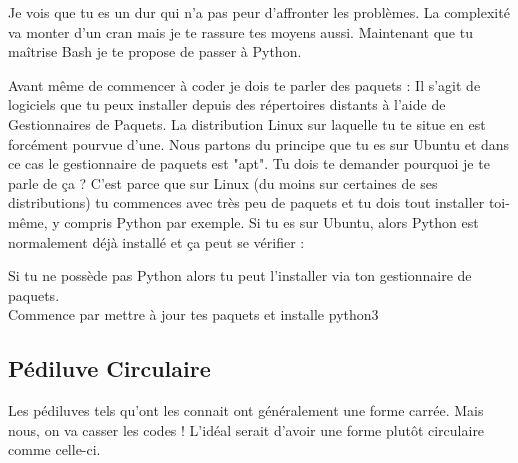\documentclass[a4paper, 12pt]{article}
\begin{document}
{\comfortaa
    Je vois que tu es un dur qui n'a pas peur d'affronter les problèmes.
    La complexité va monter d'un cran mais je te rassure tes moyens aussi.
    \newline \newline
    Maintenant que tu maîtrise Bash je te propose de passer à Python.

    Avant même de commencer à coder je dois te parler des paquets :
    \newline \newline
    Il s'agit de logiciels que tu peux installer depuis des répertoires distants à l'aide
    de Gestionnaires de Paquets. La distribution Linux sur laquelle tu te situe en est
    forcément pourvue d'une. Nous partons du principe que tu es sur Ubuntu et dans ce
    cas le gestionnaire de paquets est "apt". 
    \newline\newline
    Tu dois te demander pourquoi je te parle de ça ?
    \newline
    C'est parce que sur Linux (du moins sur certaines de ses distributions) tu commences avec très
    peu de paquets et tu dois tout installer toi-même, y compris Python par exemple.
    \newline \newline
    Si tu es sur Ubuntu, alors Python est normalement déjà installé et ça peut se vérifier :


    Si tu ne possède pas Python alors tu peut l'installer via ton gestionnaire de paquets. \\
    Commence par mettre à jour tes paquets et installe python3


    \vspace{3cm}

    \subsection{Pédiluve Circulaire}

    Les pédiluves tels qu'ont les connait ont généralement une forme carrée. Mais
    nous, on va casser les codes !
    L'idéal serait d'avoir une forme plutôt circulaire comme celle-ci.
    
}
\end{document}
